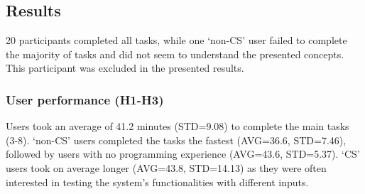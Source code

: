 \subsection{Results}
20 participants completed all tasks, while one `non-CS' user failed to complete the majority of tasks and did not seem to understand the presented concepts.
This participant was excluded in the presented results.

\subsubsection{User performance (H1-H3)} 
Users took an average of 41.2 minutes (STD=9.08) to complete the main tasks (3-8).
`non-CS' users completed the tasks the fastest (AVG=36.6, STD=7.46), followed by users with no programming experience (AVG=43.6, STD=5.37).
`CS' users took on average longer (AVG=43.8, STD=14.13) as they were often interested in testing the system's functionalities with different inputs.

